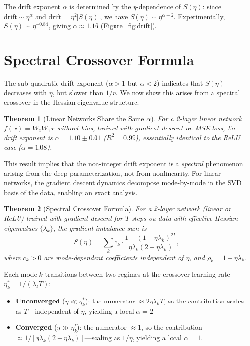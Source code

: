 \documentclass[11pt]{article}
\newcommand{\lr}{\eta}                    %
\newcommand{\drexp}{\alpha}               %
\newcommand{\imbal}{S}                    %
\newcommand{\nsteps}{T}                   %
\newtheorem{theorem}{Theorem}
\theoremstyle{definition}
\theoremstyle{remark}
\begin{document}
The drift exponent $\drexp$ is determined by the $\lr$-dependence of $\imbal(\lr)$: since $\text{drift} \sim \lr^\drexp$ and $\text{drift} = \lr^2 |\imbal(\lr)|$, we have $\imbal(\lr) \sim \lr^{\drexp - 2}$.
Experimentally, $\imbal(\lr) \sim \lr^{-0.84}$, giving $\drexp \approx 1.16$ (Figure~\ref{fig:drift}).

\section{Spectral Crossover Formula}
\label{sec:spectral}

The sub-quadratic drift exponent ($\drexp > 1$ but $\drexp < 2$) indicates that $\imbal(\lr)$ decreases with $\lr$, but slower than $1/\lr$. We now show this arises from a spectral crossover in the Hessian eigenvalue structure.

\begin{theorem}[Linear Networks Share the Same $\drexp$]\label{thm:linear}
For a 2-layer linear network $f(x) = W_2 W_1 x$ without bias, trained with gradient descent on MSE loss, the drift exponent is $\drexp = 1.10 \pm 0.01$ ($R^2 = 0.99$), essentially identical to the ReLU case ($\drexp = 1.08$).
\end{theorem}

This result implies that the non-integer drift exponent is a \emph{spectral} phenomenon arising from the deep parameterization, not from nonlinearity. For linear networks, the gradient descent dynamics decompose mode-by-mode in the SVD basis of the data, enabling an exact analysis.

\begin{theorem}[Spectral Crossover Formula]\label{thm:spectral}
For a 2-layer network (linear or ReLU) trained with gradient descent for $\nsteps$ steps on data with effective Hessian eigenvalues $\{\lambda_k\}$, the gradient imbalance sum is
\begin{equation}\label{eq:spectral}
    \imbal(\lr) = \sum_k c_k \cdot \frac{1 - (1 - \lr\lambda_k)^{2\nsteps}}{\lr\lambda_k(2 - \lr\lambda_k)},
\end{equation}
where $c_k > 0$ are mode-dependent coefficients independent of $\lr$, and $\rho_k = 1 - \lr\lambda_k$.
\end{theorem}

Each mode $k$ transitions between two regimes at the crossover learning rate $\lr_k^* = 1/(\lambda_k \nsteps)$:
\begin{itemize}
    \item \textbf{Unconverged} ($\lr \ll \lr_k^*$): the numerator $\approx 2\lr\lambda_k\nsteps$, so the contribution scales as $\nsteps$---independent of $\lr$, yielding a local $\drexp = 2$.
    \item \textbf{Converged} ($\lr \gg \lr_k^*$): the numerator $\approx 1$, so the contribution $\approx 1/[\lr\lambda_k(2-\lr\lambda_k)]$---scaling as $1/\lr$, yielding a local $\drexp = 1$.
\end{itemize}
\end{document}
